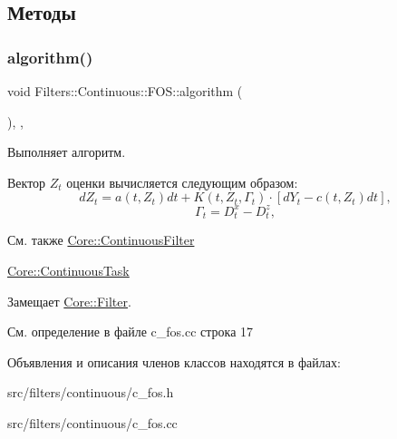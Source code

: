 \subsection{Методы}
\hypertarget{class_filters_1_1_continuous_1_1_f_o_s_a6db8005b66c345d94cdd4498edad9022}{}\label{class_filters_1_1_continuous_1_1_f_o_s_a6db8005b66c345d94cdd4498edad9022} 
\subsubsection{\texorpdfstring{algorithm()}{algorithm()}}
{\footnotesize\ttfamily void Filters\+::\+Continuous\+::\+F\+O\+S\+::algorithm (\begin{DoxyParamCaption}{ }\end{DoxyParamCaption})\hspace{0.3cm}{\ttfamily [override]}, {\ttfamily [protected]}, {\ttfamily [virtual]}}



Выполняет алгоритм. 

Вектор $Z_t$ оценки вычисляется следующим образом\+: \[dZ_t = a(t,Z_t)dt + K(t,Z_t, \Gamma_t)\cdot [ dY_t - c(t,Z_t)dt],\] \[\Gamma_t = D_t^x - D_t^z,\]

\begin{DoxySeeAlso}{См. также}
\hyperlink{class_core_1_1_continuous_filter}{Core\+::\+Continuous\+Filter} 

\hyperlink{class_core_1_1_continuous_task}{Core\+::\+Continuous\+Task} 
\end{DoxySeeAlso}


Замещает \hyperlink{class_core_1_1_filter_a438681ee3e54aba2148042d9f8011ab8}{Core\+::\+Filter}.



См. определение в файле c\+\_\+fos.\+cc строка 17



Объявления и описания членов классов находятся в файлах\+:\begin{DoxyCompactItemize}
\item 
src/filters/continuous/c\+\_\+fos.\+h\item 
src/filters/continuous/c\+\_\+fos.\+cc\end{DoxyCompactItemize}
